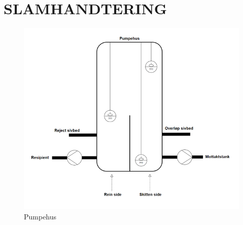 \newpage
\section{SLAMHANDTERING}

\begin{figure}[htbp]
    \centering
    \includegraphics[width=1\textwidth]{Figurar/Pumpehus.png}
    \caption{Pumpehus}\label{fig:Pumpehus}
\end{figure}

